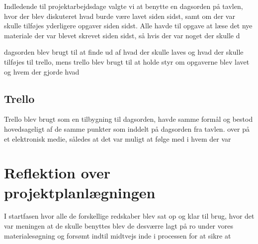Indledende til projektarbejdsdage valgte vi at benytte en dagsorden på tavlen, hvor der blev diskuteret hvad burde være lavet siden sidst, samt om der var skulle tilføjes yderligere opgaver siden sidst. Alle havde til opgave at læse det nye materiale der var blevet skrevet siden sidst, så hvis der var noget der skulle d 

dagsorden blev brugt til at finde ud af hvad der skulle laves og hvad der skulle tilføjes til trello, mens trello blev brugt til at holde styr om opgaverne blev lavet og hvem der gjorde hvad


\subsection{Trello}\label{Trello}
Trello blev brugt som en tilbygning til dagsorden, havde samme formål og bestod hovedsageligt af de samme punkter som inddelt på dagsorden fra tavlen.  over på et elektronisk medie, således at det var muligt at følge med i hvem der var 

\section{Reflektion over projektplanlægningen}\label{Reflektion-over-projektplanlaegningen}
I startfasen hvor alle de forskellige redskaber blev sat op og klar til brug, hvor det var meningen at de skulle benyttes blev de desværre lagt på ro under vores materialesøgning og forsømt indtil midtvejs inde i processen for at sikre at  